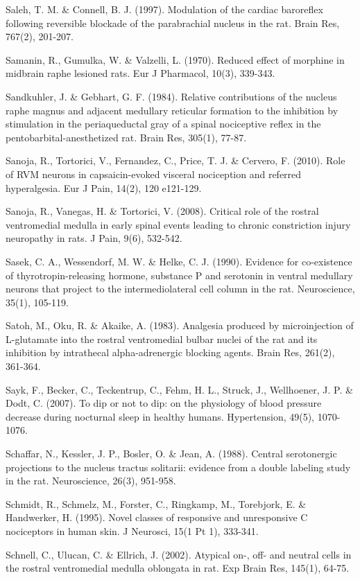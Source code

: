 \documentclass[a4paper,12pt,twoside]{report}
\begin{document}
\begin{singlespacing}
\begin{footnotesize}
Saleh, T. M. \& Connell, B. J. (1997). Modulation of the cardiac baroreflex following reversible blockade of the parabrachial nucleus in the rat. Brain Res, 767(2), 201-207.

Samanin, R., Gumulka, W. \& Valzelli, L. (1970). Reduced effect of morphine in midbrain raphe lesioned rats. Eur J Pharmacol, 10(3), 339-343.

Sandkuhler, J. \& Gebhart, G. F. (1984). Relative contributions of the nucleus raphe magnus and adjacent medullary reticular formation to the inhibition by stimulation in the periaqueductal gray of a spinal nociceptive reflex in the pentobarbital-anesthetized rat. Brain Res, 305(1), 77-87.

Sanoja, R., Tortorici, V., Fernandez, C., Price, T. J. \& Cervero, F. (2010). Role of RVM neurons in capsaicin-evoked visceral nociception and referred hyperalgesia. Eur J Pain, 14(2), 120 e121-129.

Sanoja, R., Vanegas, H. \& Tortorici, V. (2008). Critical role of the rostral ventromedial medulla in early spinal events leading to chronic constriction injury neuropathy in rats. J Pain, 9(6), 532-542.

Sasek, C. A., Wessendorf, M. W. \& Helke, C. J. (1990). Evidence for co-existence of thyrotropin-releasing hormone, substance P and serotonin in ventral medullary neurons that project to the intermediolateral cell column in the rat. Neuroscience, 35(1), 105-119.

Satoh, M., Oku, R. \& Akaike, A. (1983). Analgesia produced by microinjection of L-glutamate into the rostral ventromedial bulbar nuclei of the rat and its inhibition by intrathecal alpha-adrenergic blocking agents. Brain Res, 261(2), 361-364.

Sayk, F., Becker, C., Teckentrup, C., Fehm, H. L., Struck, J., Wellhoener, J. P. \& Dodt, C. (2007). To dip or not to dip: on the physiology of blood pressure decrease during nocturnal sleep in healthy humans. Hypertension, 49(5), 1070-1076.

Schaffar, N., Kessler, J. P., Bosler, O. \& Jean, A. (1988). Central serotonergic projections to the nucleus tractus solitarii: evidence from a double labeling study in the rat. Neuroscience, 26(3), 951-958.

Schmidt, R., Schmelz, M., Forster, C., Ringkamp, M., Torebjork, E. \& Handwerker, H. (1995). Novel classes of responsive and unresponsive C nociceptors in human skin. J Neurosci, 15(1 Pt 1), 333-341.

Schnell, C., Ulucan, C. \& Ellrich, J. (2002). Atypical on-, off- and neutral cells in the rostral ventromedial medulla oblongata in rat. Exp Brain Res, 145(1), 64-75.


\end{footnotesize}
\end{singlespacing}
\end{document}
